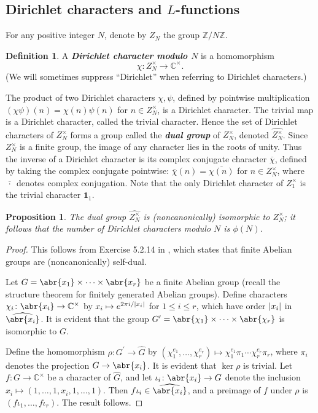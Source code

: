 \documentclass[10pt,leqno,twoside]{article}
\theoremstyle{plain}
\newtheorem{proposition}[lem]{Proposition}
\theoremstyle{definition}
\newtheorem{definition/}[lem]{Definition}
\newenvironment{definition}
  {\renewcommand{\qedsymbol}{\textdagger}%
   \pushQED{\qed}\begin{definition/}}
  {\popQED\end{definition/}}
\numberwithin{equation}{section}
\numberwithin{lem}{section}
\newcommand{\textib}[1]{\textbf{\textit{#1\index{#1}}}} %
\begin{document}
\subsection{Dirichlet characters and $L$-functions}
For any positive integer $N$, denote by $Z_N$ the group $\mathbb{Z}/N\mathbb{Z}$.
\begin{definition}
    A \textib{Dirichlet character modulo $N$} is a homomorphism 
    \[\chi\colon Z_N^\times\to \mathbb{C}^\times.\] (We will sometimes suppress ``Dirichlet'' when referring to Dirichlet characters.)
\end{definition}
The product of two Dirichlet characters $\chi,\psi$, defined by pointwise multiplication $(\chi\psi)(n) = \chi(n)\psi(n)$ for $n\in Z_N^\times$, is a Dirichlet character. The trivial map is a Dirichlet character, called the trivial character. Hence the set of Dirichlet characters of $Z_N^\times$ forms a group called the \textib{dual group} of $Z_N^\times$, denoted $\widehat{Z_N^\times}$. Since $Z_N^\times$ is a finite group, the image of any character lies in the roots of unity. Thus the inverse of a Dirichlet character is its complex conjugate character $\overline \chi$, defined by taking the complex conjugate pointwise: $\overline\chi(n) = \overline{\chi(n)}$ for $n\in Z_N^\times$, where $\overline{\,\cdot\,}$ denotes complex conjugation. Note that the only Dirichlet character of $Z_1^\times$ is the trivial character $\mathbf{1}_1$. 

\begin{proposition}
    The dual group $\widehat{Z_N^\times}$ is (noncanonically) isomorphic to $Z_N^\times$; it follows that the number of Dirichlet characters modulo $N$ is $\phi(N)$.
\end{proposition}

\begin{proof}
    This follows from Exercise 5.2.14 in \cite{df}, which states that finite Abelian groups are (noncanonically) self-dual. 

    Let $G = \abr{x_1}\times\cdots\times\abr{x_r}$ be a finite Abelian group (recall the structure theorem for finitely generated Abelian groups). Define characters $\chi_i\colon \abr{x_i}\to \mathbb C^\times$ by $x_i\mapsto e^{2\pi i/\abs{x_i}}$ for $1\leq i\leq r$, which have order $\abs{x_i}$ in $\widehat{\abr{x_i}}$. It is evident that the group $G^\prime = \abr{\chi_1}\times\cdots\times \abr{\chi_r}$ is isomorphic to $G$.

    Define the homomorphism $\rho\colon G^\prime\to \widehat G$ by $(\chi_1^{e_1},\dots,\chi_r^{e_r})\mapsto \chi_1^{e_1}\pi_1\cdots\chi_r^{e_r}\pi_r$, where $\pi_i$ denotes the projection $G\to \abr{x_i}$. It is evident that $\ker\rho$ is trivial. Let $f\colon G\to\mathbb C^\times$ be a character of $\widehat G$, and let $\iota_i\colon \abr{x_i}\to G$ denote the inclusion $x_i\mapsto (1,\dots,1,x_i,1,\dots,1)$. Then $f\iota_i\in \widehat{\abr{x_i}}$, and a preimage of $f$ under $\rho$ is $(f\iota_1,\dots,f\iota_r)$. The result follows.
\end{proof}
\end{document}

